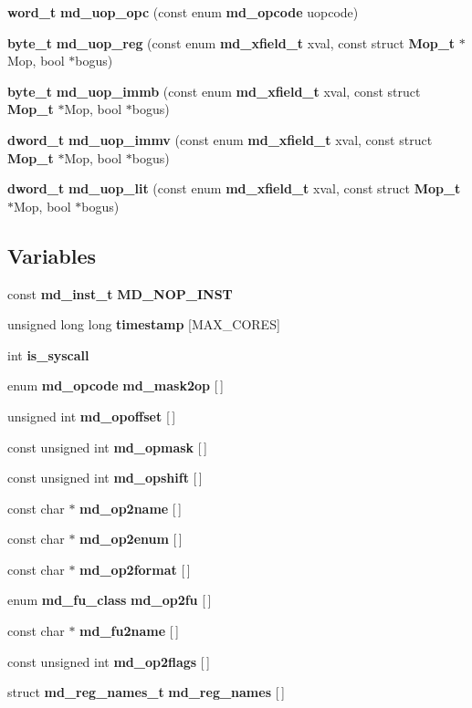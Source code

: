 \begin{CompactItemize}
\item 
{\bf word\_\-t} {\bf md\_\-uop\_\-opc} (const enum {\bf md\_\-opcode} uopcode)
\item 
{\bf byte\_\-t} {\bf md\_\-uop\_\-reg} (const enum {\bf md\_\-xfield\_\-t} xval, const struct {\bf Mop\_\-t} $\ast$Mop, bool $\ast$bogus)
\item 
{\bf byte\_\-t} {\bf md\_\-uop\_\-immb} (const enum {\bf md\_\-xfield\_\-t} xval, const struct {\bf Mop\_\-t} $\ast$Mop, bool $\ast$bogus)
\item 
{\bf dword\_\-t} {\bf md\_\-uop\_\-immv} (const enum {\bf md\_\-xfield\_\-t} xval, const struct {\bf Mop\_\-t} $\ast$Mop, bool $\ast$bogus)
\item 
{\bf dword\_\-t} {\bf md\_\-uop\_\-lit} (const enum {\bf md\_\-xfield\_\-t} xval, const struct {\bf Mop\_\-t} $\ast$Mop, bool $\ast$bogus)
\end{CompactItemize}
\subsection*{Variables}
\begin{CompactItemize}
\item 
const {\bf md\_\-inst\_\-t} {\bf MD\_\-NOP\_\-INST}
\item 
unsigned long long {\bf timestamp} [MAX\_\-CORES]
\item 
int {\bf is\_\-syscall}
\item 
enum {\bf md\_\-opcode} {\bf md\_\-mask2op} [$\,$]
\item 
unsigned int {\bf md\_\-opoffset} [$\,$]
\item 
const unsigned int {\bf md\_\-opmask} [$\,$]
\item 
const unsigned int {\bf md\_\-opshift} [$\,$]
\item 
const char $\ast$ {\bf md\_\-op2name} [$\,$]
\item 
const char $\ast$ {\bf md\_\-op2enum} [$\,$]
\item 
const char $\ast$ {\bf md\_\-op2format} [$\,$]
\item 
enum {\bf md\_\-fu\_\-class} {\bf md\_\-op2fu} [$\,$]
\item 
const char $\ast$ {\bf md\_\-fu2name} [$\,$]
\item 
const unsigned int {\bf md\_\-op2flags} [$\,$]
\item 
struct {\bf md\_\-reg\_\-names\_\-t} {\bf md\_\-reg\_\-names} [$\,$]
\end{CompactItemize}


